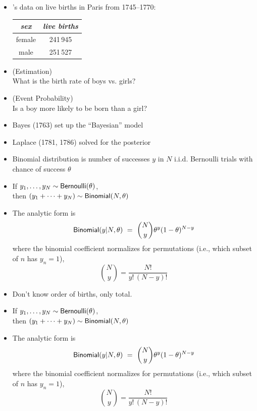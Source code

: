 \documentclass[10pt]{report}
\begin{document}


\begin{itemize}
\item {}'s data on live births in Paris from 1745--1770:
\vspace*{-4pt}
\begin{center}\small
\begin{tabular}{c|c}
{\slshape sex} & {\slshape live births}
\\ \hline
female & 241\,945
\\
male & 251\,527
\end{tabular}
\end{center}
\item {} (Estimation)
\\
What is the birth rate of boys vs. girls?

\item {} (Event Probability)
\\
Is a boy more likely to be born than a girl?
%
\item Bayes (1763) set up the ``Bayesian'' model
\item Laplace (1781, 1786) solved for the posterior
\end{itemize}


%
\begin{itemize}
\item Binomial distribution is number of successes $y$ in $N$
i.i.d. Bernoulli trials with chance of success $\theta$
\item If $y_1,\ldots,y_N\sim \text{\sf Bernoulli}(\theta)$,
\\[4pt] then $(y_1 + \cdots + y_N) \sim \text{\sf Binomial}(N,\theta)$
\item The analytic form is
\[
\text{\sf Binomial}(y|N,\theta)
\ = \ \binom{N}{y} \theta^{y} (1 - \theta)^{N-y}
\]
where the binomial coefficient normalizes for permutations (i.e.,
which subset of $n$ has $y_n = 1$),
\[
\binom{N}{y} = \frac{N!}{y! \, (N-y)!}
\]
\end{itemize}


%
\begin{itemize}
\item Don't know order of births, only total.
\item If $y_1,\ldots,y_N\sim \text{\sf Bernoulli}(\theta)$,
\\[4pt] then $(y_1 + \cdots + y_N) \sim \text{\sf Binomial}(N,\theta)$
\item The analytic form is
\[
\text{\sf Binomial}(y|N,\theta)
\ = \ \binom{N}{y} \theta^{y} (1 - \theta)^{N-y}
\]
where the binomial coefficient normalizes for permutations (i.e.,
which subset of $n$ has $y_n = 1$),
\[
\binom{N}{y} = \frac{N!}{y! \, (N-y)!}
\]
\end{itemize}
\end{document}
